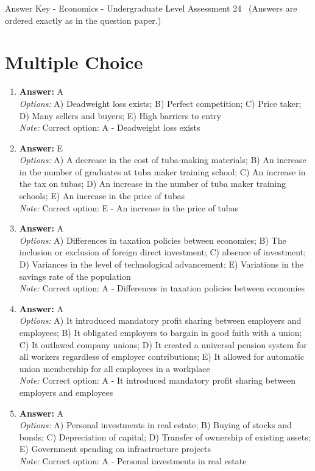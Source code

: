 \documentclass[12pt]{article}
\begin{document}
\begin{center}
Answer Key - Economics - Undergraduate Level Assessment 24 \
\small (Answers are ordered exactly as in the question paper.)
\end{center}

\section*{Multiple Choice}
\begin{enumerate}[label=\arabic*.]
\item \textbf{Answer:} A
\\ \textit{Options:} A) Deadweight loss exists; B) Perfect competition; C) Price taker; D) Many sellers and buyers; E) High barriers to entry
\\ \textit{Note:} Correct option: A - Deadweight loss exists
\item \textbf{Answer:} E
\\ \textit{Options:} A) A decrease in the cost of tuba-making materials; B) An increase in the number of graduates at tuba maker training school; C) An increase in the tax on tubas; D) An increase in the number of tuba maker training schools; E) An increase in the price of tubas
\\ \textit{Note:} Correct option: E - An increase in the price of tubas
\item \textbf{Answer:} A
\\ \textit{Options:} A) Differences in taxation policies between economies; B) The inclusion or exclusion of foreign direct investment; C) absence of investment; D) Variances in the level of technological advancement; E) Variations in the savings rate of the population
\\ \textit{Note:} Correct option: A - Differences in taxation policies between economies
\item \textbf{Answer:} A
\\ \textit{Options:} A) It introduced mandatory profit sharing between employers and employees; B) It obligated employers to bargain in good faith with a union; C) It outlawed company unions; D) It created a universal pension system for all workers regardless of employer contributions; E) It allowed for automatic union membership for all employees in a workplace
\\ \textit{Note:} Correct option: A - It introduced mandatory profit sharing between employers and employees
\item \textbf{Answer:} A
\\ \textit{Options:} A) Personal investments in real estate; B) Buying of stocks and bonds; C) Depreciation of capital; D) Transfer of ownership of existing assets; E) Government spending on infrastructure projects
\\ \textit{Note:} Correct option: A - Personal investments in real estate
\end{enumerate}
\end{document}
